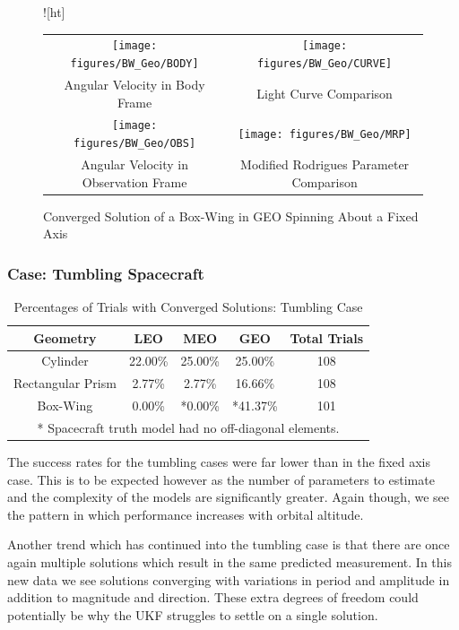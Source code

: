\begin{figure}![ht]
	\begin{tabular}{cc}
		\texttt{[image: figures/BW\_Geo/BODY]} &
		\texttt{[image: figures/BW\_Geo/CURVE]} \\
		Angular Velocity in Body Frame & Light Curve Comparison \\
		\texttt{[image: figures/BW\_Geo/OBS]} &
		\texttt{[image: figures/BW\_Geo/MRP]} \\
		Angular Velocity in Observation Frame & Modified Rodrigues Parameter Comparison
	\end{tabular}
	\caption{Converged Solution of a Box-Wing in GEO Spinning About a Fixed Axis}
\end{figure}

\subsubsection{Case: Tumbling Spacecraft}

\begin{table}[!ht]
	\begin{center}
		\begin{tabular}{| c | c | c | c | c |}
			\hline Geometry & LEO & MEO & GEO & Total Trials\\ 
			\hline Cylinder & 22.00\% & 25.00\% & 25.00\% & 108 \\
			\hline Rectangular Prism & 2.77\% & 2.77\% & 16.66\% & 108\\
			\hline Box-Wing & 0.00\% & *0.00\% & *41.37\% & 101\\
			\hline \multicolumn{5}{c}{* Spacecraft truth model had no off-diagonal elements.} \\
			\hline
			
		\end{tabular}
	\end{center}
	\caption{Percentages of Trials with Converged Solutions: Tumbling Case}
\end{table}

The success rates for the tumbling cases were far lower than in the fixed axis case. This is to be expected however as the number of parameters to estimate and the complexity of the models are significantly greater. Again though, we see the pattern in which performance increases with orbital altitude.

Another trend which has continued into the tumbling case is that there are once again multiple solutions which result in the same predicted measurement. In this new data we see solutions converging with variations in period and amplitude in addition to magnitude and direction. These extra degrees of freedom could potentially be why the UKF struggles to settle on a single solution.

